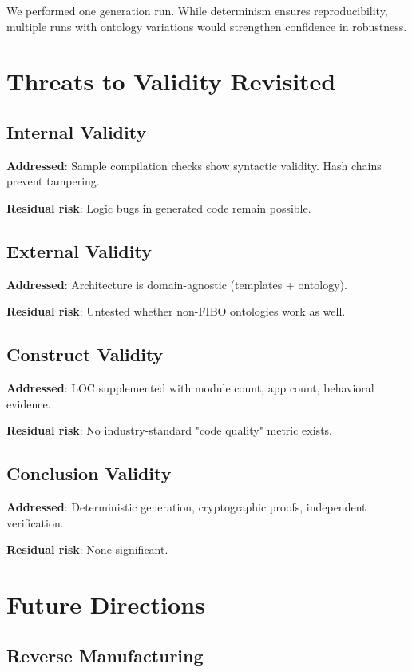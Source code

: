 We performed one generation run. While determinism ensures reproducibility, multiple runs with ontology variations would strengthen confidence in robustness.

\section{Threats to Validity Revisited}

\subsection{Internal Validity}

\textbf{Addressed}: Sample compilation checks show syntactic validity. Hash chains prevent tampering.

\textbf{Residual risk}: Logic bugs in generated code remain possible.

\subsection{External Validity}

\textbf{Addressed}: Architecture is domain-agnostic (templates + ontology).

\textbf{Residual risk}: Untested whether non-FIBO ontologies work as well.

\subsection{Construct Validity}

\textbf{Addressed}: LOC supplemented with module count, app count, behavioral evidence.

\textbf{Residual risk}: No industry-standard "code quality" metric exists.

\subsection{Conclusion Validity}

\textbf{Addressed}: Deterministic generation, cryptographic proofs, independent verification.

\textbf{Residual risk}: None significant.

\section{Future Directions}

\subsection{Reverse Manufacturing}


